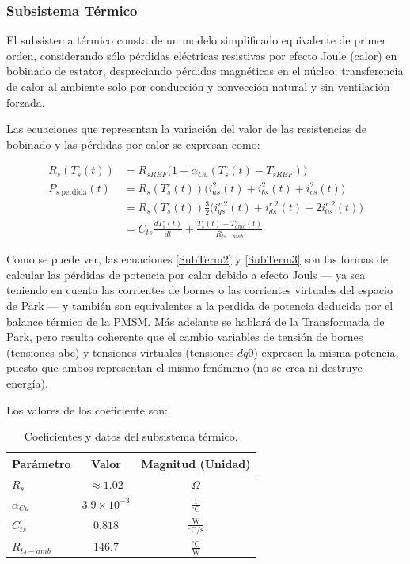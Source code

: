 \documentclass[blue,fullpaper]{ludusofficial}  %
\begin{document}
\subsubsection{Subsistema Térmico}
El subsistema térmico consta de un modelo simplificado equivalente de primer orden, considerando sólo pérdidas eléctricas resistivas por efecto Joule (calor) en bobinado de estator, despreciando pérdidas magnéticas en el núcleo; transferencia de calor al ambiente solo por conducción y convección natural y sin ventilación forzada.

Las ecuaciones que representan la variación del valor de las resistencias de bobinado y las pérdidas por calor se expresan como:

\begin{align}
    R_{s}(T_{s}^{\circ}(t)) & = R_{sREF} \Big(1 + \alpha_{Cu} (T_{s}^{\circ}(t) - T_{sREF}^{\circ}) \Big) \label{SubTerm1}\\
    P_{s \; \text{perdida}}(t)  & = R_{s}(T_{s}^{\circ}(t)) \Big( i_{as}^{2}(t) + i_{bs}^{2}(t) + i_{cs}^{2}(t) \Big)
\label{SubTerm2} \\
     & = R_{s}(T_{s}^{\circ}(t)) \frac{3}{2} \Big( i_{qs}^{r\;2}(t) + i_{ds}^{r\;2}(t) + 2i_{0s}^{r\;2}(t) \Big)
\label{SubTerm3} \\
     & = C_{ts} \frac{dT_{s}^{\circ}(t)}{dt} +  \frac{T_{s}^{\circ}(t) - T_{amb}^{\circ}(t)}{R_{ts-amb}}
\label{eq:balance-termico}
\end{align}

Como se puede ver, las ecuaciones \eqref{SubTerm2} y \eqref{SubTerm3} son las formas de calcular las pérdidas de potencia por calor debido a efecto Jouls — ya sea teniendo en cuenta las corrientes de bornes o las corrientes virtuales del espacio de Park — y también son equivalentes a la perdida de potencia deducida por el balance térmico de la PMSM. Más adelante se hablará de la Transformada de Park, pero resulta coherente que el cambio variables de tensión de bornes (tensiones abc) y tensiones virtuales (tensiones $dq0$) expresen la misma potencia, puesto que ambos representan el mismo fenómeno (no se crea ni destruye energía).

Los valores de los coeficiente son:

\begin{table}[htbp]
    \centering
    \caption{Coeficientes y datos del subsistema térmico.}
    \label{tab:parametros_carga}
    \begin{tabular}{lcc}
        \hline
        \textbf{Parámetro} & \textbf{Valor} & \textbf{Magnitud (Unidad)} \\
        \hline
        $R_s$ & $\approx 1.02$ & $\Omega$ \\
        $\alpha_{Cu}$ & $3.9 \times 10^{-3}$ & $\mathrm{\frac{1}{{}^\circ C}}$ \\
        $C_{ts}$ & $0.818$ & $\mathrm{\frac{W}{{}^\circ C/s}}$ \\
        $R_{ts-amb}$ & $146.7$ & $\mathrm{\frac{{}^\circ C}{W}}$ \\
        \hline
    \end{tabular}
\end{table}
\end{document}
